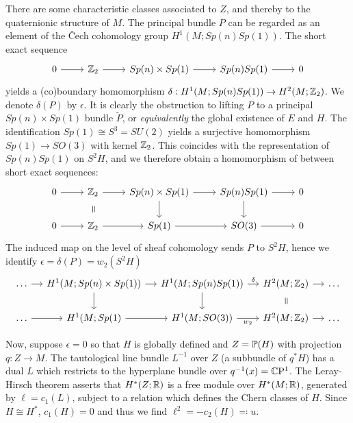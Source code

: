 \documentclass{scrartcl}
\begin{document}
There are some characteristic classes associated to $Z$, and thereby to the quaternionic structure of $M$. The principal bundle $P$ can be regarded as an element of the \v{C}ech cohomology group $H^1(M;Sp(n)Sp(1))$. The short exact sequence 
\begin{equation*}
	\begin{tikzcd}
		0\ar[r] & \Z_2 \ar[r] & Sp(n)\times Sp(1) \ar[r] & Sp(n)Sp(1) \ar[r] & 0
	\end{tikzcd}
\end{equation*}
yields a (co)boundary homomorphism $\delta:H^1(M; Sp(n)Sp(1))\to H^2(M;\Z_2)$. We denote $\delta(P)$ by $\epsilon$. It is clearly the obstruction to lifting $P$ to a principal $Sp(n)\times Sp(1)$ bundle $\tilde P$, or \emph{equivalently} the global existence of $E$ and $H$. The identification $Sp(1)\cong S^3=SU(2)$ yields a surjective homomorphism $Sp(1)\to SO(3)$ with kernel $\Z_2$. This coincides with the representation of $Sp(n)Sp(1)$ on $S^2H$,
and we therefore obtain a homomorphism of between short exact sequences:
\begin{equation*}
	\begin{tikzcd}
		0\ar[r] & \Z_2 \ar[r] \ar[draw=none]{d}[sloped,auto=false]{\scalebox{1.3}[1.3]{$=$}}
		& Sp(n)\times Sp(1) \ar[r] \ar[d] & Sp(n)Sp(1) \ar[r] \ar[d] & 0\\
		0\ar[r] & \Z_2 \ar[r] & Sp(1) \ar[r] & SO(3) \ar[r] & 0
	\end{tikzcd}
\end{equation*}
The induced map on the level of sheaf cohomology sends $P$ to $S^2H$, hence we identify $\epsilon=\delta(P)=w_2(S^2H)$ 
\begin{equation*}
	\begin{tikzcd}[column sep=small]
		\dots \ar[r] & H^1(M;Sp(n)\times Sp(1)) \ar[r] \ar[d]
		& H^1(M;Sp(n)Sp(1)) \ar[r,"\delta"] \ar[d] & H^2(M;\Z_2) \ar[r]
		 \ar[draw=none]{d}[sloped,auto=false]{\scalebox{1.3}[1.3]{$=$}} & \dots\\
		\dots\ar[r] & H^1(M;Sp(1) \ar[r] & H^1(M;SO(3)) \ar[r,"w_2"'] 
		& H^2(M;\Z_2) \ar[r] & \dots
	\end{tikzcd}
\end{equation*}

Now, suppose $\epsilon=0$ so that $H$ is globally defined and $Z=\P(H)$ with projection $q:Z\to M$. The tautological line bundle $L^{-1}$ over $Z$ (a subbundle of $q^*H$) has a dual $L$ which restricts to the hyperplane bundle over $q^{-1}(x)=\CP^1$. The Leray-Hirsch theorem asserts that $H^*(Z;\R)$ is a free module over $H^*(M;\R)$, generated by $\ell=c_1(L)$, subject to a relation which defines the Chern classes of $H$. Since $H\cong H^*$, $c_1(H)=0$ and thus we find $\ell^2=-c_2(H)\eqqcolon u$.
\end{document}
